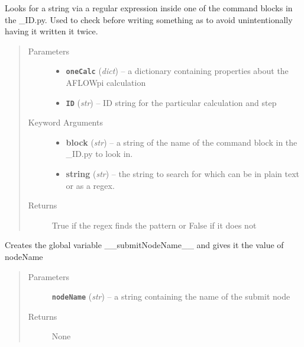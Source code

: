 \documentclass[letterpaper,10pt,english]{sphinxmanual}
\begin{document}
\begin{fulllineitems}
\label{prep:prep.__findInBlock}
Looks for a string via a regular expression inside one of the command blocks in the \_ID.py.
Used to check before writing something as to avoid unintentionally having it written it twice.
\begin{quote}\begin{description}
\item[{Parameters}] \leavevmode\begin{itemize}
\item {} 
\textbf{\texttt{oneCalc}} (\emph{dict}) -- a dictionary containing properties about the AFLOWpi calculation

\item {} 
\textbf{\texttt{ID}} (\emph{str}) -- ID string for the particular calculation and step

\end{itemize}

\item[{Keyword Arguments}] \leavevmode\begin{itemize}
\item {} 
\textbf{block} (\emph{str}) --
a string of the name of the command block in the \_ID.py to look in.

\item {} 
\textbf{string} (\emph{str}) --
the string to search for which can be in plain text or as a regex.

\end{itemize}

\item[{Returns}] \leavevmode
True if the regex finds the pattern or False if it does not

\end{description}\end{quote}

\end{fulllineitems}


\begin{fulllineitems}
\label{prep:prep.__forceSubmitNodeIP}
Creates the global variable \_\_submitNodeName\_\_ and gives it the value of nodeName
\begin{quote}\begin{description}
\item[{Parameters}] \leavevmode
\textbf{\texttt{nodeName}} (\emph{str}) -- a string containing the name of the submit node

\item[{Returns}] \leavevmode
None

\end{description}\end{quote}

\end{fulllineitems}
\end{document}
